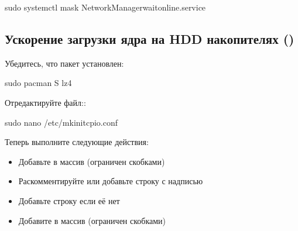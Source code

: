 \documentclass[letterpaper,10pt,russian,openany]{sphinxmanual}
\begin{document}
\begin{sphinxVerbatim}[commandchars=\\\{\}]
sudo systemctl mask NetworkManager\PYGZhy{}wait\PYGZhy{}online.service
\end{sphinxVerbatim}

\ignorespaces 

\subsection{Ускорение загрузки ядра на HDD накопителях ()}
\label{\detokenize{source/generic-system-acceleration:hdd}}\label{\detokenize{source/generic-system-acceleration:speed-up-hdd-startup}}\label{\detokenize{source/generic-system-acceleration:index-9}}
\sphinxAtStartPar
Убедитесь, что пакет  установлен:

\begin{sphinxVerbatim}[commandchars=\\\{\}]
sudo pacman \PYGZhy{}S lz4
\end{sphinxVerbatim}

\sphinxAtStartPar
Отредактируйте файл::

\begin{sphinxVerbatim}[commandchars=\\\{\}]
sudo nano /etc/mkinitcpio.conf
\end{sphinxVerbatim}

\sphinxAtStartPar
Теперь выполните следующие действия:
\begin{itemize}
\item {} 
\sphinxAtStartPar
Добавьте  в массив  (ограничен скобками)

\item {} 
\sphinxAtStartPar
Раскомментируйте или добавьте строку с надписью 

\item {} 
\sphinxAtStartPar
Добавьте строку если её нет \sphinxhyphen{}  

\item {} 
\sphinxAtStartPar
Добавите  в массив  (ограничен скобками)

\end{itemize}
\end{document}
